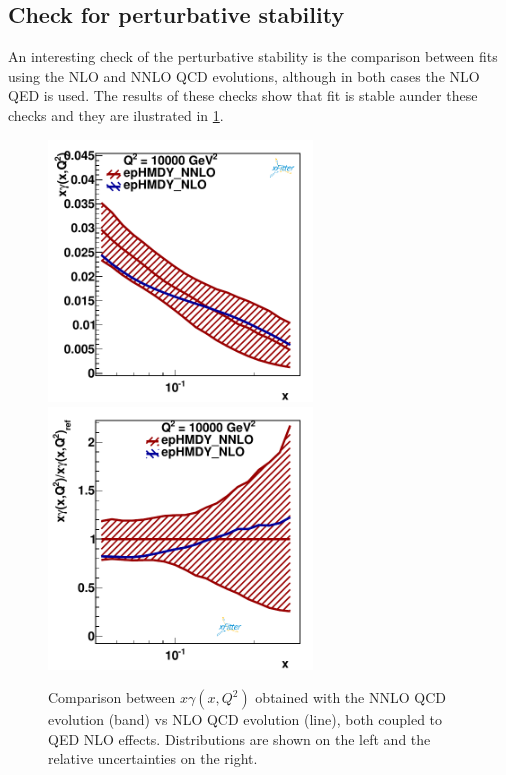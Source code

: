 \subsection{Check for perturbative stability}

An interesting check of the perturbative stability is the 
comparison between fits using the NLO and NNLO QCD evolutions,
although in both cases the NLO QED is used. The results of
these checks show that fit is stable aunder these checks
and they are ilustrated in \ref{fig:nlo_vs_nnlo}. 

\begin{figure}[h]
\centering
\includegraphics[width=7cm]{figs/q2_10000_pdf_ph_NLOvsNNLO.pdf}
\includegraphics[width=7cm]{figs/q2_10000_pdf_ph_ratio_NLOvsNNLO.pdf}
\caption{Comparison between $x\gamma(x,Q^2)$ obtained with the
NNLO QCD evolution (band) vs NLO QCD evolution (line), both coupled to 
QED NLO effects. Distributions are shown on the left and the relative 
uncertainties on the right.
}
\label{fig:nlo_vs_nnlo}
\end{figure}
